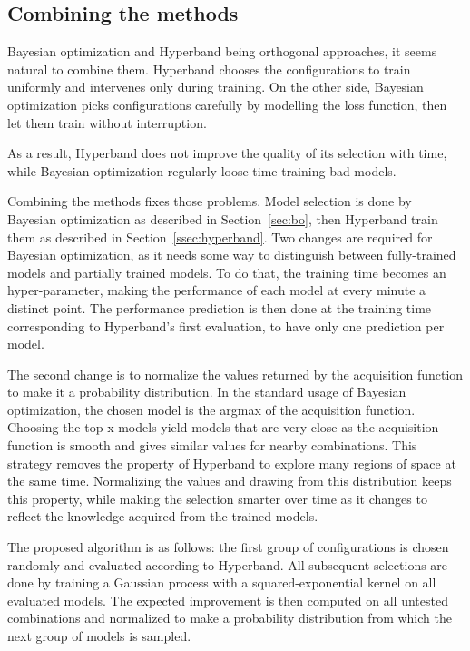 \subsection{Combining the methods}

Bayesian optimization and Hyperband being orthogonal approaches, it seems natural to combine them. Hyperband chooses the configurations to train uniformly and intervenes only during training. On the other side, Bayesian optimization picks configurations carefully by modelling the loss function, then let them train without interruption.

As a result, Hyperband does not improve the quality of its selection with time, while Bayesian optimization regularly loose time training bad models.

Combining the methods fixes those problems. Model selection is done by Bayesian optimization as described in Section~\ref{sec:bo}, then Hyperband train them as described in Section~\ref{ssec:hyperband}. Two changes are required for Bayesian optimization, as it needs some way to distinguish between fully-trained models and partially trained models. To do that, the training time becomes an hyper-parameter, making the performance of each model at every minute a distinct point. The performance prediction is then done at the training time corresponding to Hyperband's first evaluation, to have only one prediction per model.

The second change is to normalize the values returned by the acquisition function to make it a probability distribution. In the standard usage of Bayesian optimization, the chosen model is the argmax of the acquisition function. Choosing the top x models yield models that are very close as the acquisition function is smooth and gives similar values for nearby combinations. This strategy removes the property of Hyperband to explore many regions of space at the same time. Normalizing the values and drawing from this distribution keeps this property, while making the selection smarter over time as it changes to reflect the knowledge acquired from the trained models.

The proposed algorithm is as follows: the first group of configurations is chosen randomly and evaluated according to Hyperband. All subsequent selections are done by training a Gaussian process with a squared-exponential kernel on all evaluated models. The expected improvement is then computed on all untested combinations and normalized to make a probability distribution from which the next group of models is sampled.

